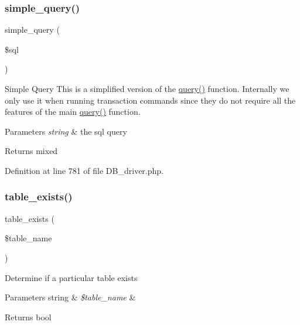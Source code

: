\subsubsection{\texorpdfstring{simple\_query()}{simple\_query()}}
{\footnotesize\ttfamily simple\+\_\+query (\begin{DoxyParamCaption}\item[{}]{\$sql }\end{DoxyParamCaption})}

Simple Query This is a simplified version of the \mbox{\hyperlink{class_c_i___d_b__driver_a4711d63638a755f763352472063f0bbf}{query()}} function. Internally we only use it when running transaction commands since they do not require all the features of the main \mbox{\hyperlink{class_c_i___d_b__driver_a4711d63638a755f763352472063f0bbf}{query()}} function.


\begin{DoxyParams}{Parameters}
{\em string} & the sql query \\
\hline
\end{DoxyParams}
\begin{DoxyReturn}{Returns}
mixed 
\end{DoxyReturn}


Definition at line 781 of file D\+B\+\_\+driver.\+php.

\mbox{\label{class_c_i___d_b__driver_af148cb2cd5d490d2a480c0c741ceed03}} 
\subsubsection{\texorpdfstring{table\_exists()}{table\_exists()}}
{\footnotesize\ttfamily table\+\_\+exists (\begin{DoxyParamCaption}\item[{}]{\$table\+\_\+name }\end{DoxyParamCaption})}

Determine if a particular table exists


\begin{DoxyParams}[1]{Parameters}
string & {\em \$table\+\_\+name} & \\
\hline
\end{DoxyParams}
\begin{DoxyReturn}{Returns}
bool 
\end{DoxyReturn}


